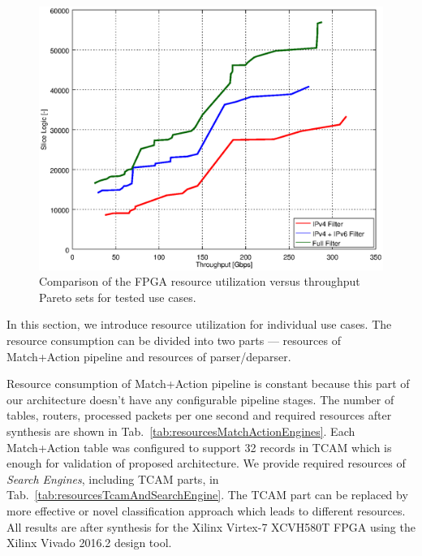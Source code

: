 \begin{figure}
    \centering
    \includegraphics[scale=0.61]{chapters/pic/graphs/p4-pipeline/thr_slice_logic_pareto}
    \caption{Comparison of the FPGA resource utilization versus throughput Pareto sets for tested use cases.}
    \label{fig:useCasesParetoSets}
\end{figure}

In this section, we introduce resource utilization for individual use cases. The resource consumption can be divided into two  
parts --- resources of Match+Action pipeline and resources of parser/deparser.

Resource consumption of Match+Action pipeline is constant because this part of our architecture doesn't have any configurable
pipeline stages. The number of tables, routers, processed packets per one second and required resources after synthesis are shown in
Tab.~\ref{tab:resourcesMatchActionEngines}.
Each Match+Action table was configured to support 32 records in TCAM which is enough for validation of proposed architecture.
We provide required resources of \textit{Search Engines}, including TCAM parts, in Tab.~\ref{tab:resourcesTcamAndSearchEngine}. 
The TCAM part can be replaced by more effective or novel classification approach which leads to different resources.
All results are after synthesis for the Xilinx Virtex-7 XCVH580T FPGA using the Xilinx Vivado 2016.2 design tool. 

